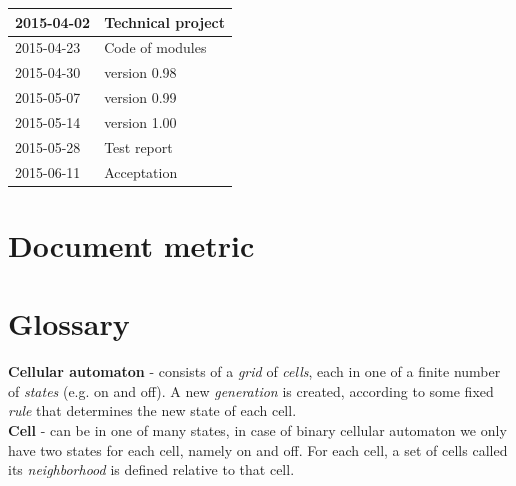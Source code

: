 \documentclass{article}
\begin{document}
\begin{center}

	\begin{tabular}{| l | p{7cm} |}

		\hline
	  	2015-04-02 & Technical project \\
		
		\hline
	  	2015-04-23 & Code of modules\\
	
		\hline
		2015-04-30 & version 0.98\\

		\hline
		2015-05-07 & version 0.99\\	
		
		\hline
		2015-05-14 & version 1.00\\
		
		\hline
		2015-05-28 & Test report\\
		
		\hline
		2015-06-11 & Acceptation \\
		
		\hline
	
	\end{tabular}

\end{center}

\section{Document metric}



\newpage


\section{Glossary} \par


\setlength{\parindent}{5ex}
\Large {\bf \hspace{15pt} Cellular automaton } - consists of a \textit{grid} of \textit{cells}, each in one of a finite number of \textit{states} (e.g. on and off). 
	A new \textit{generation} is created, according to some fixed
	\textit{rule} that determines the new state of each cell. \\


\Large {\bf 
	Cell 
}	
	- can be in one of many states,
	in case of binary cellular automaton we only have two states for each cell, namely on and off.
	For each cell, a set of cells called its
	\textit{neighborhood} is defined relative to that cell.	\\
\end{document}
